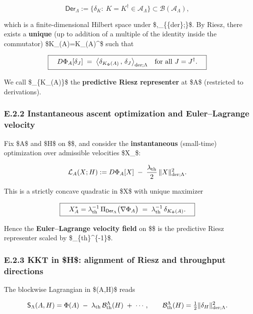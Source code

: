\documentclass[
]{article}
\numberwithin{equation}{section}
\begin{document}
\[
\mathsf{Der}_\Lambda:=\{\delta_K:\ K=K^\dagger\in\mathcal A_\Lambda\}\subset \mathcal B(\mathcal A_\Lambda),
\]

which is a finite-dimensional Hilbert space under
\$\langle\cdot,\cdot\rangle\_\{\{\rm der\};\Lambda\}\$. By Riesz, there
exists a \textbf{unique} (up to addition of a multiple of the identity
inside the commutator) \$K\_\Phi(A)=K\_\Phi(A)\^{}\dagger\$ such that

\[
\boxed{\quad D\Phi_A[\delta_J]\;=\;\big\langle \delta_{K_\Phi(A)}\,,\,\delta_J\big\rangle_{{\rm der};\Lambda}
\quad\text{for all }J=J^\dagger.\quad}
\]

We call \$\delta\_\{K\_\Phi(A)\}\$ the \textbf{predictive Riesz
representer} at \$A\$ (restricted to derivations).

\hypertarget{e.2.2-instantaneous-ascent-optimization-and-eulerlagrange-velocity}{%
\subsubsection{E.2.2 Instantaneous ascent optimization and
Euler--Lagrange
velocity}\label{e.2.2-instantaneous-ascent-optimization-and-eulerlagrange-velocity}}

Fix \$A\$ and \$H\$ on \$\Lambda\$, and consider the
\textbf{instantaneous} (small-time) optimization over admissible
velocities \$X\in{}\_\Lambda\$:

\[
\mathcal L_A(X;H):=D\Phi_A[X]\;-\;\frac{\lambda_{\rm th}}{2}\,\|X\|_{{\rm der};\Lambda}^{2}.
\]

This is a strictly concave quadratic in \$X\$ with unique maximizer

\[
\boxed{\quad X^*_A=\lambda_{\rm th}^{-1}\,\Pi_{\mathsf{Der}_\Lambda}\big(\nabla\Phi_A\big)
\;=\;\lambda_{\rm th}^{-1}\,\delta_{K_\Phi(A)}.\quad}
\]

Hence the \textbf{Euler--Lagrange velocity field} on \$\Lambda\$ is the
predictive Riesz representer scaled by
\$\lambda\_\{\rm th\}\^{}\{-1\}\$.

\hypertarget{e.2.3-kkt-in-h-alignment-of-riesz-and-throughput-directions}{%
\subsubsection{E.2.3 KKT in \$H\$: alignment of Riesz and throughput
directions}\label{e.2.3-kkt-in-h-alignment-of-riesz-and-throughput-directions}}

The blockwise Lagrangian in \$(A,H)\$ reads

\[
\mathsf S_\Lambda(A,H)=\Phi(A)\;-\;\lambda_{\rm th}\,\mathcal B_{\rm th}^\Lambda(H)\;+\;\cdots,
\qquad \mathcal B_{\rm th}^\Lambda(H)=\tfrac12\|\delta_H\|_{{\rm der};\Lambda}^2.
\]
\end{document}
